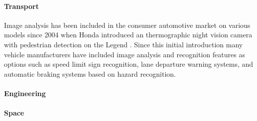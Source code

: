 	\paragraph{Transport}
	Image analysis has been included in the consumer automotive market on various models since 2004 when Honda introduced an thermographic night vision camera with pedestrian detection on the Legend  \citep{hondanightvision}. Since this initial introduction many vehicle manufacturers have included image analysis and recognition features as options such as speed limit sign recognition, lane departure warning systems, and automatic braking systems based on hazard recognition.
	\paragraph{Engineering}
	
	\paragraph{Space}